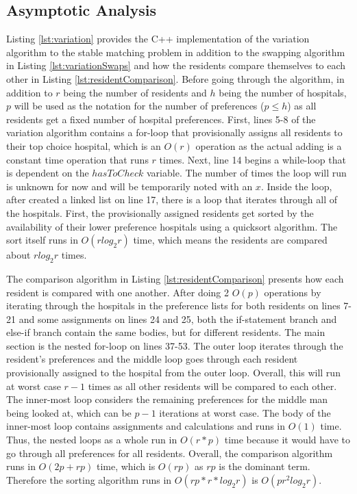 \documentclass[letterpaper, 10pt,DIV=13]{scrartcl}
\numberwithin{equation}{section} %
\numberwithin{figure}{section} %
\numberwithin{table}{section} %
\begin{document}
\subsection{Asymptotic Analysis}\label{variationAnalysis}
Listing \ref{lst:variation} provides the C++ implementation of the variation algorithm to the stable matching problem in addition to the swapping algorithm in Listing \ref{lst:variationSwaps} and how the residents compare themselves to each other in Listing \ref{lst:residentComparison}. Before going through the algorithm, in addition to $r$ being the number of residents and $h$ being the number of hospitals, $p$ will be used as the notation for the number of preferences ($p \le h$) as all residents get a fixed number of hospital preferences. First, lines 5-8 of the variation algorithm contains a for-loop that provisionally assigns all residents to their top choice hospital, which is an $O(r)$ operation as the actual adding is a constant time operation that runs $r$ times. Next, line 14 begins a while-loop that is dependent on the $hasToCheck$ variable. The number of times the loop will run is unknown for now and will be temporarily noted with an $x$. Inside the loop, after created a linked list on line 17, there is a loop that iterates through all of the hospitals. First, the provisionally assigned residents get sorted by the availability of their lower preference hospitals using a quicksort algorithm. The sort itself runs in $O(rlog_2r)$ time, which means the residents are compared about $rlog_2r$ times.

The comparison algorithm in Listing \ref{lst:residentComparison} presents how each resident is compared with one another. After doing 2 $O(p)$ operations by iterating through the hospitals in the preference lists for both residents on lines 7-21 and some assignments on lines 24 and 25, both the if-statement branch and else-if branch contain the same bodies, but for different residents. The main section is the nested for-loop on lines 37-53. The outer loop iterates through the resident's preferences and the middle loop goes through each resident provisionally assigned to the hospital from the outer loop. Overall, this will run at worst case $r - 1$ times as all other residents will be compared to each other. The inner-most loop considers the remaining preferences for the middle man being looked at, which can be $p - 1$ iterations at worst case. The body of the inner-most loop contains assignments and calculations and runs in $O(1)$ time. Thus, the nested loops as a whole run in $O(r * p)$ time because it would have to go through all preferences for all residents. Overall, the comparison algorithm runs in $O(2p + rp)$ time, which is $O(rp)$ as $rp$ is the dominant term. Therefore the sorting algorithm runs in $O(rp * r * log_2r)$ is $O(pr^2log_2r)$.
\end{document}
